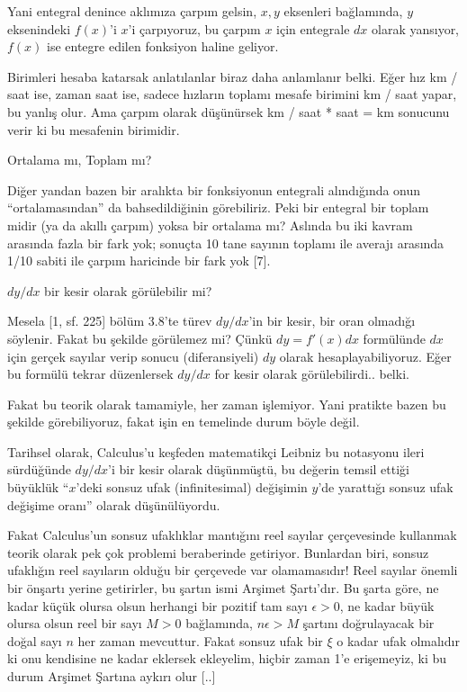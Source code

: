 \documentclass[12pt,fleqn]{article}\usepackage{../../common}
\begin{document}
Yani entegral denince aklımıza çarpım gelsin, $x,y$ eksenleri bağlamında,
$y$ eksenindeki $f(x)$'i $x$'i çarpıyoruz, bu çarpım $x$ için entegrale
$dx$ olarak yansıyor, $f(x)$ ise entegre edilen fonksiyon haline geliyor. 

Birimleri hesaba katarsak anlatılanlar biraz daha anlamlanır belki. Eğer
hız km / saat ise, zaman saat ise, sadece hızların toplamı mesafe birimini
km / saat yapar, bu yanlış olur. Ama çarpım olarak düşünürsek km / saat *
saat = km sonucunu verir ki bu mesafenin birimidir. 

Ortalama mı, Toplam mı?

Diğer yandan bazen bir aralıkta bir fonksiyonun entegrali alındığında onun
``ortalamasından'' da bahsedildiğinin görebiliriz. Peki bir entegral bir
toplam midir (ya da akıllı çarpım) yoksa bir ortalama mı? Aslında bu iki
kavram arasında fazla bir fark yok; sonuçta 10 tane sayının toplamı ile
averajı arasında 1/10 sabiti ile çarpım haricinde bir fark yok [7]. 

















$dy/dx$ bir kesir olarak görülebilir mi? 

Mesela [1, sf. 225] bölüm 3.8'te türev $dy/dx$'in bir kesir, bir oran
olmadığı söylenir. Fakat bu şekilde görülemez mi? Çünkü $dy = f'(x)dx$
formülünde $dx$ için gerçek sayılar verip sonucu (diferansiyeli) $dy$
olarak hesaplayabiliyoruz. Eğer bu formülü tekrar düzenlersek $dy/dx$ for
kesir olarak görülebilirdi.. belki.

Fakat bu teorik olarak tamamiyle, her zaman işlemiyor. Yani pratikte bazen
bu şekilde görebiliyoruz, fakat işin en temelinde durum böyle değil.

Tarihsel olarak, Calculus'u keşfeden matematikçi Leibniz bu notasyonu ileri
sürdüğünde $dy/dx$'i bir kesir olarak düşünmüştü, bu değerin temsil ettiği
büyüklük ``$x$'deki sonsuz ufak (infinitesimal) değişimin $y$'de yarattığı
sonsuz ufak değişime oranı'' olarak düşünülüyordu.

Fakat Calculus'un sonsuz ufaklıklar mantığını reel sayılar çerçevesinde
kullanmak teorik olarak pek çok problemi beraberinde getiriyor. Bunlardan
biri, sonsuz ufaklığın reel sayıların olduğu bir çerçevede var
olamamasıdır! Reel sayılar önemli bir önşartı yerine getirirler, bu şartın
ismi Arşimet Şartı'dır. Bu şarta göre, ne kadar küçük olursa olsun herhangi
bir pozitif tam sayı $\epsilon > 0$, ne kadar büyük olursa olsun reel bir
sayı $M>0$ bağlamında, $n\epsilon > M$ şartını doğrulayacak bir doğal sayı
$n$ her zaman mevcuttur. Fakat sonsuz ufak bir $\xi$ o kadar ufak olmalıdır
ki onu kendisine ne kadar eklersek ekleyelim, hiçbir zaman 1'e erişemeyiz,
ki bu durum Arşimet Şartına aykırı olur [..]
\end{document}
